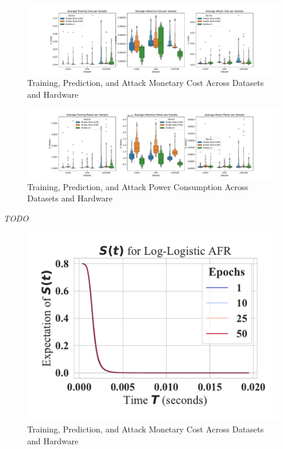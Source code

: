 \documentclass[conference]{IEEEtran}
\newcommand{\cm}[1]{\textit{{\color{blue}#1}}}
\begin{document}
\begin{figure}
    \centering
    \includegraphics[width=\textwidth]{plots/combined/cost.pdf}
    \caption{Training, Prediction, and Attack Monetary Cost Across Datasets and Hardware}
    \label{fig:cost}
\end{figure}

\begin{figure}
    \centering
    \includegraphics[width=\textwidth]{plots/combined/power.pdf}
    \caption{Training, Prediction, and Attack Power Consumption Across Datasets and Hardware}
    \label{fig:power}
\end{figure}

\cm{TODO}

\begin{figure}
    \centering
    \includegraphics[width=.45\textwidth]{plots/combined/log_logistic_epochs_partial_effect.pdf}
    \caption{Training, Prediction, and Attack Monetary Cost Across Datasets and Hardware}
    \label{fig:cost}
\end{figure}
\end{document}
